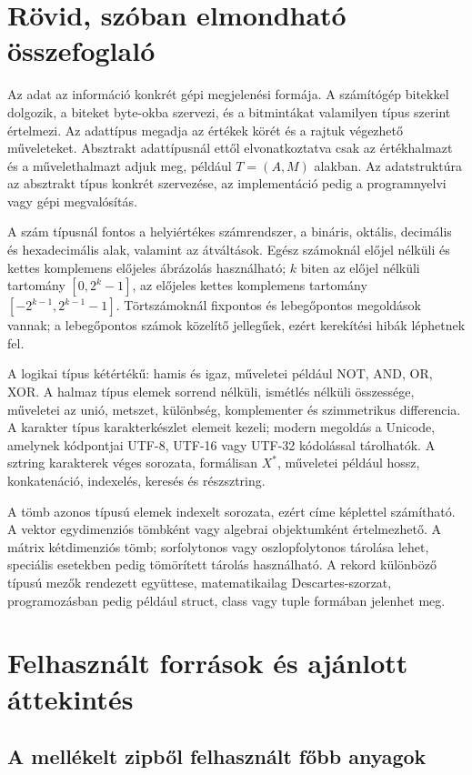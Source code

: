 \section{Rövid, szóban elmondható összefoglaló}

Az adat az információ konkrét gépi megjelenési formája. A számítógép bitekkel dolgozik, a biteket byte-okba szervezi, és a bitmintákat valamilyen típus szerint értelmezi. Az adattípus megadja az értékek körét és a rajtuk végezhető műveleteket. Absztrakt adattípusnál ettől elvonatkoztatva csak az értékhalmazt és a művelethalmazt adjuk meg, például $T=(A,M)$ alakban. Az adatstruktúra az absztrakt típus konkrét szervezése, az implementáció pedig a programnyelvi vagy gépi megvalósítás.

A szám típusnál fontos a helyiértékes számrendszer, a bináris, oktális, decimális és hexadecimális alak, valamint az átváltások. Egész számoknál előjel nélküli és kettes komplemens előjeles ábrázolás használható; $k$ biten az előjel nélküli tartomány $[0,2^k-1]$, az előjeles kettes komplemens tartomány $[-2^{k-1},2^{k-1}-1]$. Törtszámoknál fixpontos és lebegőpontos megoldások vannak; a lebegőpontos számok közelítő jellegűek, ezért kerekítési hibák léphetnek fel.

A logikai típus kétértékű: hamis és igaz, műveletei például NOT, AND, OR, XOR. A halmaz típus elemek sorrend nélküli, ismétlés nélküli összessége, műveletei az unió, metszet, különbség, komplementer és szimmetrikus differencia. A karakter típus karakterkészlet elemeit kezeli; modern megoldás a Unicode, amelynek kódpontjai UTF-8, UTF-16 vagy UTF-32 kódolással tárolhatók. A sztring karakterek véges sorozata, formálisan $X^*$, műveletei például hossz, konkatenáció, indexelés, keresés és részsztring.

A tömb azonos típusú elemek indexelt sorozata, ezért címe képlettel számítható. A vektor egydimenziós tömbként vagy algebrai objektumként értelmezhető. A mátrix kétdimenziós tömb; sorfolytonos vagy oszlopfolytonos tárolása lehet, speciális esetekben pedig tömörített tárolás használható. A rekord különböző típusú mezők rendezett együttese, matematikailag Descartes-szorzat, programozásban pedig például struct, class vagy tuple formában jelenhet meg.

\section{Felhasznált források és ajánlott áttekintés}

\subsection*{A mellékelt zipből felhasznált főbb anyagok}

